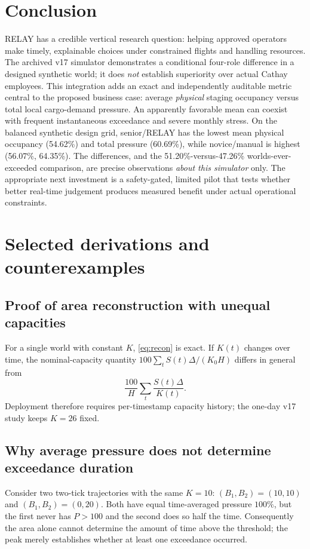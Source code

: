 \documentclass[10pt,a4paper]{article}
\theoremstyle{definition}\newtheorem{definition}[theorem]{Definition}
\theoremstyle{remark}\newtheorem{remark}[theorem]{Remark}
\newcommand{\1}{\mathbbm 1}
\begin{document}
\section{Conclusion}
RELAY has a credible vertical research question: helping approved operators make timely, explainable choices under constrained flights and handling resources. The archived v17 simulator demonstrates a conditional four-role difference in a designed synthetic world; it does \emph{not} establish superiority over actual Cathay employees. This integration adds an exact and independently auditable metric central to the proposed business case: average \emph{physical} staging occupancy versus total local cargo-demand pressure. An apparently favorable mean can coexist with frequent instantaneous exceedance and severe monthly stress. On the balanced synthetic design grid, senior/RELAY has the lowest mean physical occupancy (54.62\%) and total pressure (60.69\%), while novice/manual is highest (56.07\%, 64.35\%). The differences, and the 51.20\%-versus-47.26\% worlds-ever-exceeded comparison, are precise observations \emph{about this simulator} only. The appropriate next investment is a safety-gated, limited pilot that tests whether better real-time judgement produces measured benefit under actual operational constraints.

\appendix
\section{Selected derivations and counterexamples}
\subsection{Proof of area reconstruction with unequal capacities}
For a single world with constant $K$, \eqref{eq:recon} is exact. If $K(t)$ changes over time, the nominal-capacity quantity $100\sum_t S(t)\Delta/(K_0H)$ differs in general from
\[
\frac{100}{H}\sum_t\frac{S(t)\Delta}{K(t)}.
\]
Deployment therefore requires per-timestamp capacity history; the one-day v17 study keeps $K=26$ fixed.

\subsection{Why average pressure does not determine exceedance duration}
Consider two two-tick trajectories with the same $K=10$: $(B_1,B_2)=(10,10)$ and $(B_1,B_2)=(0,20)$. Both have equal time-averaged pressure $100\%$, but the first never has $P>100$ and the second does so half the time. Consequently the area alone cannot determine the amount of time above the threshold; the peak merely establishes whether at least one exceedance occurred.
\end{document}
